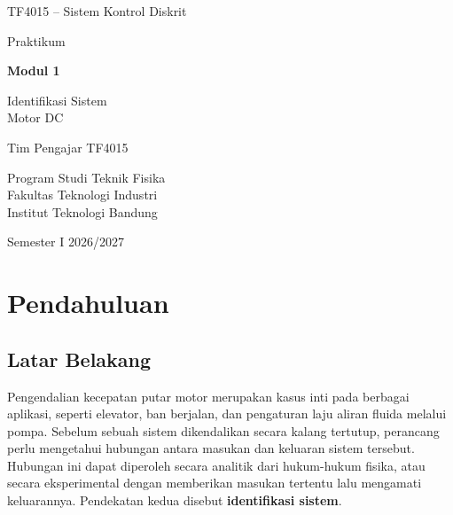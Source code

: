 \documentclass[11pt,a4paper]{article}
\begin{document}
\begin{titlepage}
	\centering
	\vspace*{2cm}
	{\large TF4015 -- Sistem Kontrol Diskrit\par}
	\vspace{2.5cm}
	{\Large Praktikum\par}
	\vspace{0.4cm}
	{\huge\bfseries Modul 1\par}
	\vspace{0.4cm}
	{\LARGE Identifikasi Sistem\\Motor DC\par}
	\vfill
	{\large Tim Pengajar TF4015\par}
	\vspace{0.3cm}
	{\large Program Studi Teknik Fisika\\Fakultas Teknologi Industri\\Institut Teknologi Bandung\par}
	\vspace{0.8cm}
	{\large Semester I 2026/2027\par}
\end{titlepage}

\tableofcontents
\newpage
{}
\setcounter{page}{1}

\section{Pendahuluan}
\subsection{Latar Belakang}
Pengendalian kecepatan putar motor merupakan kasus inti pada berbagai aplikasi, seperti elevator, ban berjalan, dan pengaturan laju aliran fluida melalui pompa. Sebelum sebuah sistem dikendalikan secara kalang tertutup, perancang perlu mengetahui hubungan antara masukan dan keluaran sistem tersebut. Hubungan ini dapat diperoleh secara analitik dari hukum-hukum fisika, atau secara eksperimental dengan memberikan masukan tertentu lalu mengamati keluarannya. Pendekatan kedua disebut \textbf{identifikasi sistem}.
\end{document}
